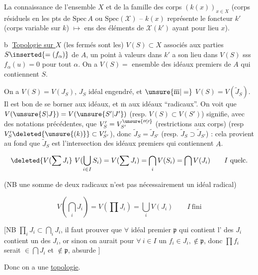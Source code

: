 
La connaissance de l'ensemble $X$ et de la famille des corps $(k(x))_{x\in X}$ (corps résiduels  en les pts de $\mathrm{Spec}\,A$ ou $\mathrm{Spec}(\mathscr X)$ -- $k(x)$ représente le foncteur $k'$ (corps variable sur $k$) $\longmapsto$ ens des  éléments de $\mathscr X(k')$ ayant pour lieu $x$).

\textcircled{b} \uline{Topologie sur $X$} (les fermés sont les) $V(S)\subset X$ associés aux parties $S\inserted{=(f_\alpha)}$ de $A$,  un point  à valeurs dans $k'$ a son lieu dans $V(S)$ sss $f_\alpha(u)=0$ pour tout $\alpha$. On a  $V(S)=$ ensemble des idéaux premiers de $A$ qui contiennent $S$.

On a $V(S)=V(J_S)$, $J_S$ idéal engendré, et $\unsure{\overline{\mathrm m}|=}$ $V(S)=V(\widetilde J_S)$. Il  est bon de se borner aux idéaux, et $\overline{\mathrm m}$ aux idéaux ``radicaux''.  On voit que $V(\unsure{S|J})=V(\unsure{S'|J'})$ (resp. $V(S)\subset V(S')$) signifie, avec des notations précédentes, que $V'_S=V^{\unsure{\prime\prime|\prime}}_{S'}$ (restrictions aux corps)  (resp $V'_S\deleted{\unsure{(k)}}\subset V'_{S'}$), donc $\widetilde J_S=\widetilde J_{S'}$ (resp. $\widetilde J_S\supset\widetilde J_{S'}$) : cela provient au fond que $\widetilde J_S$ est l'intersection des idéaux premiers qui contiennent $A$.

\[
\deleted{V(\sum J_i}\ V(\bigcup_{i\in I}S_i)=V(\sum J_i)=\bigcap_i V(S_i)=\bigcap V(J_i)
\qquad I\ \text{quelc.}
\]

(NB une  somme de deux   radicaux n'est pas nécessairement un idéal radical)

\[
V(\bigcap_i J_i)=V(\prod J_i)=\bigcup_i V(J_i)\qquad I\ \text{fini}
\]

[NB $\prod_i J_i\subset\bigcap_i J_i$, il faut prouver que $\forall$ idéal premier $\mathfrak p$ qui contient l' des $J_i$ contient un des $J_i$, or sinon on aurait pour $\forall\ i\in I$ un $f_i\in J_i,\notin\mathfrak p$,  donc $\prod f_i$ serait $\in\bigcap J_i$ et $\notin\mathfrak p$, absurde ] 

Donc on a une \uline{topologie}.

